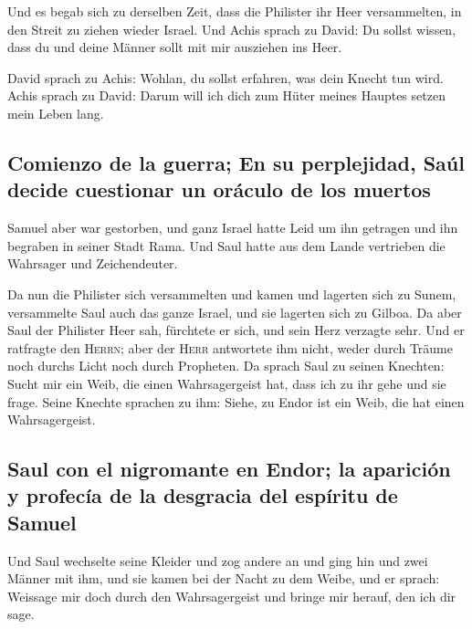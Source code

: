  Und es begab sich zu derselben Zeit, dass die Philister
ihr Heer versammelten, in den Streit zu ziehen wieder Israel. Und Achis
sprach zu David: Du sollst wissen, dass du und deine Männer sollt mit
mir ausziehen ins Heer.

 David sprach zu Achis: Wohlan, du sollst erfahren, was
dein Knecht tun wird. Achis sprach zu David: Darum will ich dich zum
Hüter meines Hauptes setzen mein Leben lang.

\hypertarget{comienzo-de-la-guerra-en-su-perplejidad-sauxfal-decide-cuestionar-un-oruxe1culo-de-los-muertos}{%
\subsection{Comienzo de la guerra; En su perplejidad, Saúl decide
cuestionar un oráculo de los
muertos}\label{comienzo-de-la-guerra-en-su-perplejidad-sauxfal-decide-cuestionar-un-oruxe1culo-de-los-muertos}}

 Samuel aber war gestorben, und ganz Israel hatte Leid um
ihn getragen und ihn begraben in seiner Stadt Rama. Und Saul hatte aus
dem Lande vertrieben die Wahrsager und Zeichendeuter.

 Da nun die Philister sich versammelten und kamen und
lagerten sich zu Sunem, versammelte Saul auch das ganze Israel, und sie
lagerten sich zu Gilboa.  Da aber Saul der Philister Heer
sah, fürchtete er sich, und sein Herz verzagte sehr.  Und
er ratfragte den \textsc{Herrn}; aber der \textsc{Herr} antwortete ihm
nicht, weder durch Träume noch durchs Licht noch durch Propheten.
 Da sprach Saul zu seinen Knechten: Sucht mir ein Weib,
die einen Wahrsagergeist hat, dass ich zu ihr gehe und sie frage. Seine
Knechte sprachen zu ihm: Siehe, zu Endor ist ein Weib, die hat einen
Wahrsagergeist.

\hypertarget{saul-con-el-nigromante-en-endor-la-apariciuxf3n-y-profecuxeda-de-la-desgracia-del-espuxedritu-de-samuel}{%
\subsection{Saul con el nigromante en Endor; la aparición y profecía de
la desgracia del espíritu de
Samuel}\label{saul-con-el-nigromante-en-endor-la-apariciuxf3n-y-profecuxeda-de-la-desgracia-del-espuxedritu-de-samuel}}

 Und Saul wechselte seine Kleider und zog andere an und
ging hin und zwei Männer mit ihm, und sie kamen bei der Nacht zu dem
Weibe, und er sprach: Weissage mir doch durch den Wahrsagergeist und
bringe mir herauf, den ich dir sage.

